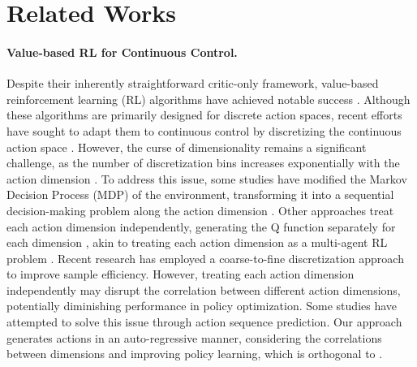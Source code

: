 \section{Related Works}

\paragraph{Value-based RL for Continuous Control.}
Despite their inherently straightforward critic-only framework, value-based reinforcement learning (RL) algorithms have achieved notable success \cite{NatureDQN,AlphaGo,AlphaZero,GQN,CQN}. 
Although these algorithms are primarily designed for discrete action spaces, recent efforts have sought to adapt them to continuous control by discretizing the continuous action space \cite{BDQ,DecQN}. 
However, the curse of dimensionality remains a significant challenge, as the number of discretization bins increases exponentially with the action dimension \cite{DDPG}.
To address this issue, some studies have modified the Markov Decision Process (MDP) of the environment, transforming it into a sequential decision-making problem along the action dimension \cite{SDQN,QTransformer}. 
Other approaches treat each action dimension independently, generating the Q function separately for each dimension \cite{BDQ,HGQN,DecQN,GQN}, akin to treating each action dimension as a multi-agent RL problem \cite{COMA,MAPPO}.
Recent research \cite{CQN} has employed a coarse-to-fine discretization approach to improve sample efficiency.
However, treating each action dimension independently may disrupt the correlation between different action dimensions, potentially diminishing performance in policy optimization.
Some studies \cite{CQNAS} have attempted to solve this issue through action sequence prediction.
Our approach generates actions in an auto-regressive manner, considering the correlations between dimensions and improving policy learning, which is orthogonal to \cite{CQNAS}.

\vspace{-1em}
